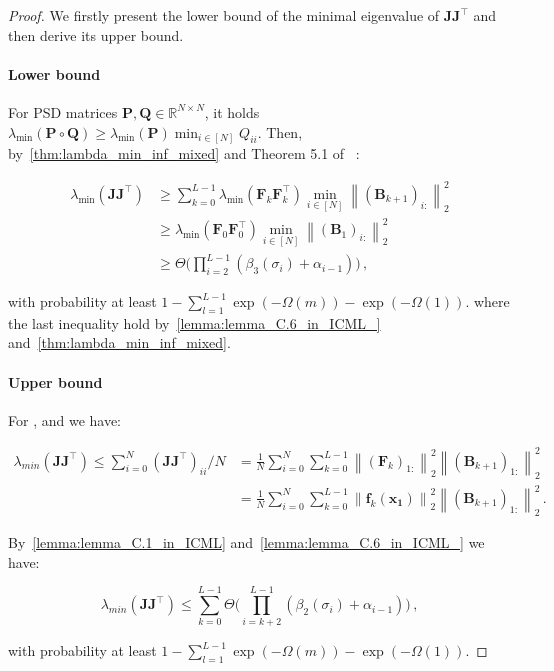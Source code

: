 \documentclass[nohyperref]{article}
\theoremstyle{plain}
\theoremstyle{definition}
\theoremstyle{remark}
\begin{document}
\begin{proof}
We firstly present the lower bound of the minimal eigenvalue of $\bm{JJ}^{\top}$ and then derive its upper bound.
\
\paragraph{Lower bound\\}
For PSD matrices $\bm{P}, \bm{Q} \in \mathbb{R}^{N \times N}$, it holds $\lambda_{\min}(\bm{P}\circ \bm{Q})\geq \lambda_{\min}(\bm{P}) \min_{i \in [N]}Q_{ii}$. Then, by~\cref{thm:lambda_min_inf_mixed} and Theorem 5.1 of ~\citet{pmlr-v139-nguyen21g}:

\begin{equation*}
\begin{split}
\lambda_{\min}(\bm{JJ}^{\top})&\geq \sum_{k=0}^{L-1}\lambda_{\min}(\bm{F}_k \bm{F}_k^{\top})\min_{i\in[N]}\left \| (\bm{B}_{k+1})_{i:} \right \|_2^2\\
&\geq \lambda_{\min}(\bm{F}_0 \bm{F}_0^{\top})\min_{i\in[N]}\left \| (\bm{B}_{1})_{i:} \right \|_2^2\\
&\geq \Theta \bigg(\prod_{i=2}^{L-1}(\beta_3(\sigma_i)+\alpha_{i-1} ) \bigg)\,,
\end{split}
\end{equation*}

with probability at least $1-\sum_{l=1}^{L-1}\exp(-\Omega (m))-\exp(-\Omega (1))$. where the last inequality hold by~\cref{lemma:lemma_C.6_in_ICML_} and~\cref{thm:lambda_min_inf_mixed}.

\paragraph{Upper bound\\}


For ,  and  we have:

\begin{equation*}
\begin{split}
    \lambda_{min}(\bm{JJ}^{\top})\leq \sum_{i=0}^{N}(\bm{JJ}^{\top})_{ii}/N & = \frac{1}{N}\sum_{i=0}^{N}\sum_{k=0}^{L-1}\left \| (\bm{F}_k)_{1:} \right \|_2^2 \left \| (\bm{B}_{k+1})_{1:} \right \|_2^2\\
    & = \frac{1}{N}\sum_{i=0}^{N}\sum_{k=0}^{L-1}\left \| \bm{f}_k(\bm{x_1}) \right \|_2^2 \left \| (\bm{B}_{k+1})_{1:} \right \|_2^2\,.
    \end{split}
\end{equation*}

By~\cref{lemma:lemma_C.1_in_ICML} and~\cref{lemma:lemma_C.6_in_ICML_} we have:


\begin{equation*}
\lambda_{min}(\bm{JJ}^{\top}) \leq \sum_{k=0}^{L-1}\Theta \bigg(\prod_{i=k+2}^{L-1}(\beta_2(\sigma_i)+\alpha_{i-1} ) \bigg)\,,
\end{equation*}

with probability at least $1-\sum_{l=1}^{L-1}\exp(-\Omega (m))-\exp(-\Omega (1))$.

\end{proof}
\end{document}
